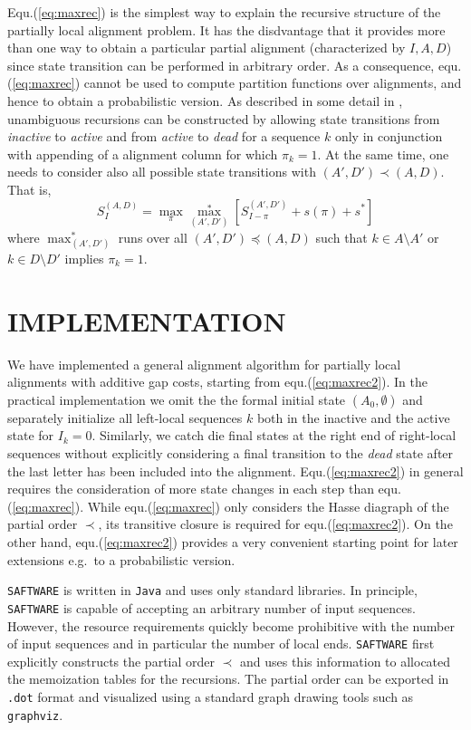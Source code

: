 \documentclass[a4paper,10pt]{article}
\newcommand{\TODO}[1]{\begingroup\color{red}#1\endgroup}
\newcommand{\SAFTWARE}{\TODO{\texttt{SAFTWARE}}}
\begin{document}
Equ.(\ref{eq:maxrec}) is the simplest way to explain the recursive
structure of the partially local alignment problem. It has the disdvantage
that it provides more than one way to obtain a particular partial alignment
(characterized by $I,A,D$) since state transition can be performed in
arbitrary order. As a consequence, equ.(\ref{eq:maxrec}) cannot be used to
compute partition functions over alignments, and hence to obtain a
probabilistic version. As described in some detail in \citet{Retzlaff:18a},
unambiguous recursions can be constructed by allowing state transitions
from \textit{inactive} to \textit{active} and from \textit{active} to
\textit{dead} for a sequence $k$ only in conjunction with appending of a
alignment column for which $\pi_k=1$.  At the same time, one needs to
consider also all possible state transitions with $(A',D')\prec(A,D)$. That
is,
\begin{equation}
  S^{(A,D)}_I = 
  \displaystyle\max_{\pi} \displaystyle\max_{(A',D')}^*
  \left[ S^{(A',D')}_{I-\pi} + s(\pi) + s^* \right]
  \label{eq:maxrec2}
\end{equation}
where $\max_{(A',D')}^*$ runs over all $(A',D')\preceq(A,D)$ such that
$k\in A\setminus A'$ or $k\in D\setminus D'$ implies $\pi_k=1$.

\section{\uppercase{Implementation}}

We have implemented a general alignment algorithm for partially local
alignments with additive gap costs, starting from
equ.(\ref{eq:maxrec2}). In the practical implementation we omit the the
formal initial state $(A_0,\emptyset)$ and separately initialize all
left-local sequences $k$ both in the inactive and the active state for
$I_k=0$. Similarly, we catch die final states at the right end of
right-local sequences without explicitly considering a final transition to
the \textit{dead} state after the last letter has been included into the
alignment. Equ.(\ref{eq:maxrec2}) in general requires the consideration of
more state changes in each step than equ.(\ref{eq:maxrec}). While
equ.(\ref{eq:maxrec}) only considers the Hasse diagraph of the partial
order $\prec$, its transitive closure is required for
equ.(\ref{eq:maxrec2}). On the other hand, equ.(\ref{eq:maxrec2}) provides
a very convenient starting point for later extensions e.g.\ to a
probabilistic version. 

\SAFTWARE{} is written in \texttt{Java} and uses only standard libraries.
In principle, \SAFTWARE{} is capable of accepting an arbitrary number of
input sequences. However, the resource requirements quickly become
prohibitive with the number of input sequences and in particular the number
of local ends. \SAFTWARE{} first explicitly constructs the partial order
$\prec$ and uses this information to allocated the memoization tables for
the recursions. The partial order can be exported in \texttt{.dot} format
and visualized using a standard graph drawing tools such as
\texttt{graphviz}.
\end{document}

